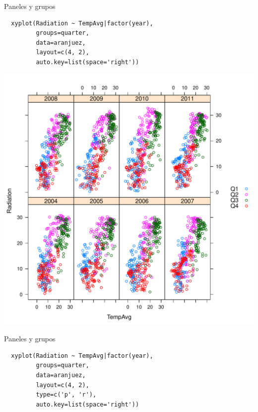 \documentclass[xcolor={usenames,svgnames,dvipsnames}]{beamer}
\begin{document}
\begin{frame}[fragile,label=sec-2-1-14]{Paneles y grupos}
 \lstset{language=R,label= ,caption= ,numbers=none}
\begin{lstlisting}
  xyplot(Radiation ~ TempAvg|factor(year),
         groups=quarter,
         data=aranjuez,
         layout=c(4, 2),
         auto.key=list(space='right'))
\end{lstlisting}
\end{frame}

\begin{frame}[label=sec-2-1-15]{}
\includegraphics[width=.9\linewidth]{figs/xyplotQuarterYear.pdf}
\end{frame}

\begin{frame}[fragile,label=sec-2-1-16]{Paneles y grupos}
 \lstset{language=R,label= ,caption= ,numbers=none}
\begin{lstlisting}
  xyplot(Radiation ~ TempAvg|factor(year),
         groups=quarter,
         data=aranjuez,
         layout=c(4, 2),
         type=c('p', 'r'),
         auto.key=list(space='right'))
\end{lstlisting}
\end{frame}
\end{document}
